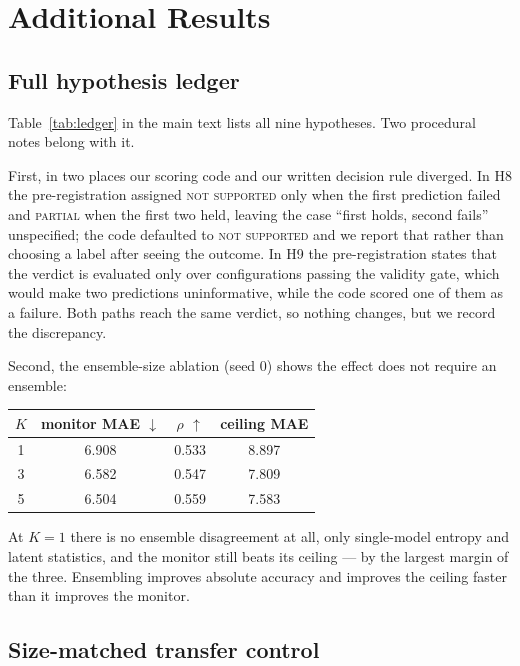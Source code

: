 \section{Additional Results}
\label{app:additional}

\subsection{Full hypothesis ledger}

Table~\ref{tab:ledger} in the main text lists all nine hypotheses. Two procedural notes belong
with it.

First, in two places our scoring code and our written decision rule diverged. In H8 the
pre-registration assigned \textsc{not supported} only when the first prediction failed and
\textsc{partial} when the first two held, leaving the case ``first holds, second fails''
unspecified; the code defaulted to \textsc{not supported} and we report that rather than
choosing a label after seeing the outcome. In H9 the pre-registration states that the verdict
is evaluated only over configurations passing the validity gate, which would make two
predictions uninformative, while the code scored one of them as a failure. Both paths reach the
same verdict, so nothing changes, but we record the discrepancy.

Second, the ensemble-size ablation (seed 0) shows the effect does not require an ensemble:

\begin{center}\small
\begin{tabular}{cccc}
\toprule
$K$ & monitor MAE $\downarrow$ & $\rho$ $\uparrow$ & ceiling MAE \\
\midrule
1 & 6.908 & 0.533 & 8.897 \\
3 & 6.582 & 0.547 & 7.809 \\
5 & 6.504 & 0.559 & 7.583 \\
\bottomrule
\end{tabular}
\end{center}

At $K=1$ there is no ensemble disagreement at all, only single-model entropy and latent
statistics, and the monitor still beats its ceiling --- by the largest margin of the three.
Ensembling improves absolute accuracy and improves the ceiling faster than it improves the
monitor.

\subsection{Size-matched transfer control}

